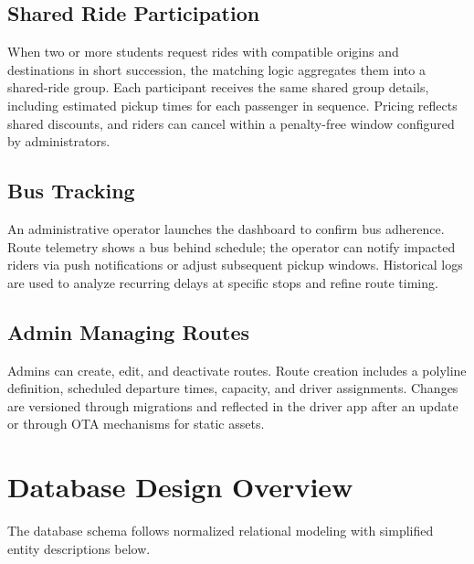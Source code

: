 \documentclass[12pt,a4paper]{article}
\begin{document}
\subsection{Shared Ride Participation}
When two or more students request rides with compatible origins and destinations in short succession, the matching logic aggregates them into a shared-ride group. Each participant receives the same shared group details, including estimated pickup times for each passenger in sequence. Pricing reflects shared discounts, and riders can cancel within a penalty-free window configured by administrators.

\subsection{Bus Tracking}
An administrative operator launches the dashboard to confirm bus adherence. Route telemetry shows a bus behind schedule; the operator can notify impacted riders via push notifications or adjust subsequent pickup windows. Historical logs are used to analyze recurring delays at specific stops and refine route timing.

\subsection{Admin Managing Routes}
Admins can create, edit, and deactivate routes. Route creation includes a polyline definition, scheduled departure times, capacity, and driver assignments. Changes are versioned through migrations and reflected in the driver app after an update or through OTA mechanisms for static assets.

\section{Database Design Overview}
The database schema follows normalized relational modeling with simplified entity descriptions below.
\end{document}
